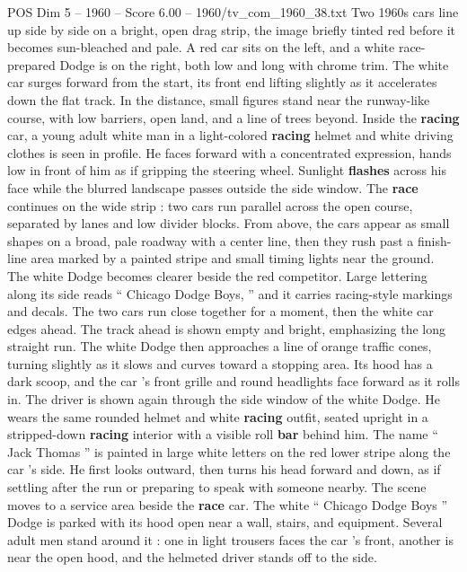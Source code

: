 \begin{textsample}{POS Dim 5 – 1960 – Score 6.00 – 1960/tv\_com\_1960\_38.txt}  \label{ex:f5_pos_056}
Two 1960s cars line up side by side on a bright, open drag strip, the image briefly tinted red before it becomes sun-bleached and pale.
A red car sits on the left, and a white race-prepared Dodge is on the right, both low and long with chrome trim.
The white car surges forward from the start, its front end lifting slightly as it accelerates down the flat track.
In the distance, small figures stand near the runway-like course, with low barriers, open land, and a line of trees beyond.
Inside the \textbf{racing} car, a young adult white man in a light-colored \textbf{racing} helmet and white driving clothes is seen in profile.
He faces forward with a concentrated expression, hands low in front of him as if gripping the steering wheel.
Sunlight \textbf{flashes} across his face while the blurred landscape passes outside the side window.
The \textbf{race} continues on the wide strip : two cars run parallel across the open course, separated by lanes and low divider blocks.
From above, the cars appear as small shapes on a broad, pale roadway with a center line, then they rush past a finish-line area marked by a painted stripe and small timing lights near the ground.
The white Dodge becomes clearer beside the red competitor.
Large lettering along its side reads “ Chicago Dodge Boys, ” and it carries racing-style markings and decals.
The two cars run close together for a moment, then the white car edges ahead.
The track ahead is shown empty and bright, emphasizing the long straight run.
The white Dodge then approaches a line of orange traffic cones, turning slightly as it slows and curves toward a stopping area.
Its hood has a dark scoop, and the car ’s front grille and round headlights face forward as it rolls in.
The driver is shown again through the side window of the white Dodge.
He wears the same rounded helmet and white \textbf{racing} outfit, seated upright in a stripped-down \textbf{racing} interior with a visible roll \textbf{bar} behind him.
The name “ Jack Thomas ” is painted in large white letters on the red lower stripe along the car ’s side.
He first looks outward, then turns his head forward and down, as if settling after the run or preparing to speak with someone nearby.
The scene moves to a service area beside the \textbf{race} car.
The white “ Chicago Dodge Boys ” Dodge is parked with its hood open near a wall, stairs, and equipment.
Several adult men stand around it : one in light trousers faces the car ’s front, another is near the open hood, and the helmeted driver stands off to the side.

\end{textsample}
